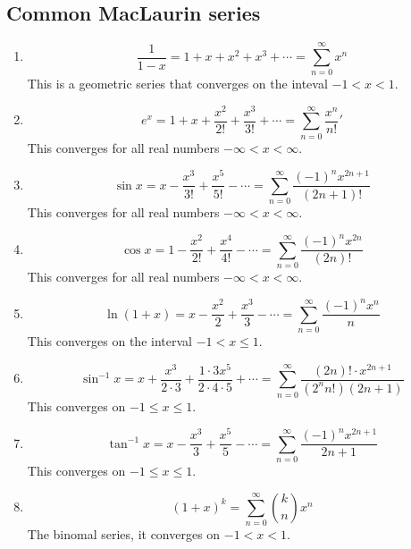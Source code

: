 \documentclass{report}
\begin{document}
    \subsection{Common MacLaurin series}
        \begin{enumerate}
            \item \[\frac{1}{1-x} = 1 + x + x^2 + x^3 + \cdots = \sum_{n=0}^{\infty} x^n\]
            This is a geometric series that converges on the inteval \(-1 < x < 1\).
            \item \[e^x = 1 + x + \frac{x^2}{2!} + \frac{x^3}{3!} + \cdots = \sum_{n=0}^{\infty} \frac{x^n}{n!}'\]
            This converges for all real numbers \(- \infty < x < \infty\).
            \item \[\sin x = x - \frac{x^3}{3!} + \frac{x^5}{5!} - \cdots = \sum_{n=0}^{\infty} \frac{(-1)^n x^{2n+1}}{(2n+1)!}\]
            This converges for all real numbers \(- \infty < x < \infty\).
            \item \[\cos x = 1 - \frac{x^2}{2!} + \frac{x^4}{4!} - \cdots = \sum_{n=0}^{\infty} \frac{(-1)^n x^{2n}}{(2n)!}\]
            This converges for all real numbers \(- \infty < x < \infty\).
            \item \[\ln (1+x) = x - \frac{x^2}{2} + \frac{x^3}{3} - \cdots = \sum_{n=0}^{\infty} \frac{(-1)^n x^n}{n}\]
            This converges on the interval \(-1 < x \leq 1\).
            \item \[\sin^{-1} x = x + \frac{x^3}{2 \cdot 3} + \frac{1 \cdot 3x^5}{2 \cdot 4 \cdot 5} + \cdots = \sum_{n=0}^{\infty} \frac{(2n)! \cdot x^{2n+1}}{(2^n n!) (2n+1)}\]
            This converges on \(-1 \leq x \leq 1\).
            \item \[\tan^{-1} x = x - \frac{x^3}{3} + \frac{x^5}{5} - \cdots = \sum_{n=0}^{\infty} \frac{(-1)^n x^{2n+1}}{2n+1}\]
            This converges on \(-1 \leq x \leq 1\).
            \item \[(1+x)^k = \sum_{n=0}^{\infty} \binom{k}{n} x^n\]
            The binomal series, it converges on \(-1 < x < 1\).
        \end{enumerate}
\end{document}
